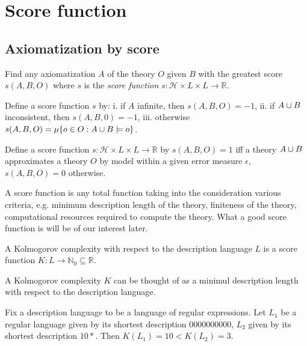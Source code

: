 \chapter{Score function}

\section{Axiomatization by score}
Find any axiomatization $A$ of the theory $O$ given $B$ with the greatest score $s(A,B,O)$ where $s$ is the \emph{score function}
$s:\mathcal{H} \times L \times L \to \mathbb{R}$.

\begin{exmp}
Define a score function $s$ by:
i. if $A$ infinite, then $s(A,B,O)=-1$,
ii. if $A \cup B$ inconsistent, then $s(A,B,0)=-1$,
iii. otherwise $s(A,B,O)=\mu\{o \in O : A \cup B \models o\}$.
\end{exmp}

\begin{exmp}
Define a score function $s:\mathcal{H} \times L \times L \to \mathbb{R}$ by $s(A,B,O)=1$ iff a theory $A \cup B$ approximates a theory $O$ by model within a given error measure $\epsilon$, $s(A,B,O)=0$ otherwise.
\end{exmp}

\begin{note}
A score function is any total function taking into the consideration various criteria, e.g. minimum description length of the theory, finiteness of the theory, computational resources required to compute the theory. What a good score function is will be of our interest later.
\end{note}

\begin{exmp}
A Kolmogorov complexity with respect to the description language $L$ is a score function $K:L \to \mathbb{N}_0 \subseteq \mathbb{R}$.
\end{exmp}

\begin{note}
A Kolmogorov complexity $K$ can be thought of as a minimul description length with respect to the description language.
\end{note}
\begin{exmp}
Fix a description language to be a language of regular expressions. Let $L_1$ be a regular language given by its shortest description $0000000000$, $L_2$ given by its shortest description $10*$. Then $K(L_1)=10<K(L_2)=3$.
\end{exmp}

